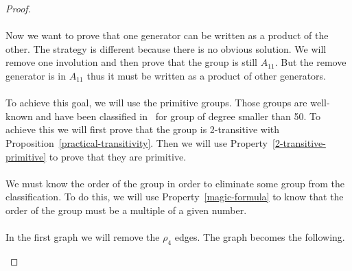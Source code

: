 \begin{proof}
\begin{figure}[H]
\begin{center}
\begin{tikzpicture}[scale=.8]
    \end{tikzpicture}
    \caption{}
  \end{center}
\end{figure}

\paragraph{}
Now we want to prove that one generator can be written as a product of the other. The strategy is different because there is no obvious solution. We will remove one involution and then prove that the group is still $A_{11}$. But the remove generator is in $A_{11}$ thus it must be written as a product of other generators.

\paragraph{}
To achieve this goal, we will use the primitive groups. Those groups are well-known and have been classified in~\cite{bukenhoutlist1998} for group of degree smaller than 50. To achieve this we will first prove that the group is 2-transitive with Proposition~\ref{practical-transitivity}. Then we will use Property~\ref{2-transitive-primitive} to prove that they are primitive.

\paragraph{}
We must know the order of the group in order to eliminate some group from the classification. To do this, we will use Property~\ref{magic-formula} to know that the order of the group must be a multiple of a given number.

\paragraph{}
In the first graph we will remove the $\rho_4$ edges. The graph becomes the following.

\begin{figure}[H]
  \begin{center}
\end{center}
\end{figure}
\end{proof}
